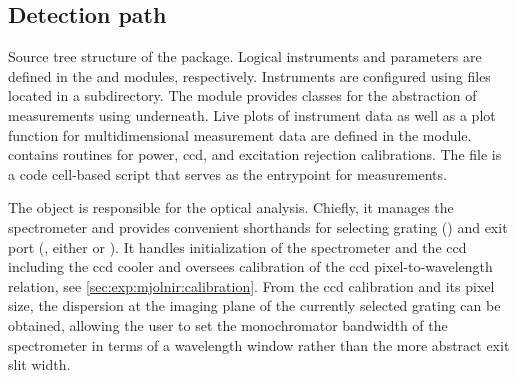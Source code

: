\subsection{Detection path}\label{subsec:exp:mjolnir:logical_instruments:det}
\begin{marginfigure}
    
    \caption[]{
        Source tree structure of the \mjolnir package.
        Logical \qcodes instruments and parameters are defined in the  and  modules, respectively.
        Instruments are configured using  files located in a  subdirectory.
        The  module provides classes for the abstraction of measurements using \qcodes underneath.
        Live plots of instrument data as well as a plot function for multidimensional measurement data are defined in the  module.
         contains routines for power, \acrshort{ccd}, and excitation rejection calibrations.
        The  file is a code cell-based script that serves as the entrypoint for measurements.
    }
    \label{fig:exp:mjolnir:tree}
\end{marginfigure}

The  object is responsible for the optical analysis.
Chiefly, it manages the \thespectrometer spectrometer and provides convenient shorthands for selecting grating () and exit port (, either  or ).
It handles initialization of the spectrometer and the \gls{ccd} including the \gls{ccd} cooler and oversees calibration of the \gls{ccd} pixel-to-wavelength relation, see \cref{sec:exp:mjolnir:calibration}.
From the \gls{ccd} calibration and its pixel size, the dispersion at the imaging plane of the currently selected grating can be obtained, allowing the user to set the monochromator bandwidth of the spectrometer in terms of a wavelength window rather than the more abstract exit slit width.

